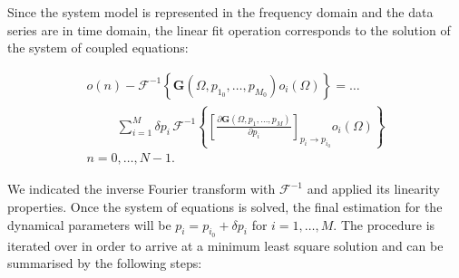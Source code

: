 Since the system model is represented in the frequency domain and the data series are
in time domain, the linear fit operation corresponds to the solution of the system
of coupled equations:

\begin{eqnarray}
	o\left(n\right) - \mathcal{F}^{-1}\left\{ \mathbf{G}\left(\Omega, p_{1_0}, \ldots, p_{M_0}\right) o_i\left(\Omega\right) \right\} = \ldots \nonumber \\
	\hspace{1cm}\sum_{i=1}^{M} \delta p_i \, \mathcal{F}^{-1} \left\{ \left[\frac{\partial \mathbf{G}\left(\Omega, p_{1}, \ldots, p_{M}\right)}{\partial p_i}\right]_{p_i \rightarrow p_{i_0}} o_i\left(\Omega\right) \right\} \nonumber \\
	n = 0, \ldots, N-1.
	\label{eqn:linearfit}
\end{eqnarray}

We indicated the inverse Fourier transform with $\mathcal{F}^{-1}$ and applied its linearity
properties. Once the system of equations is solved, the final estimation
for the dynamical parameters will be $p_i = p_{i_0} + \delta p_i$ for $i = 1, \ldots,
M$. The procedure is iterated over in order to arrive at a minimum least square
solution and can be summarised by the following steps:

